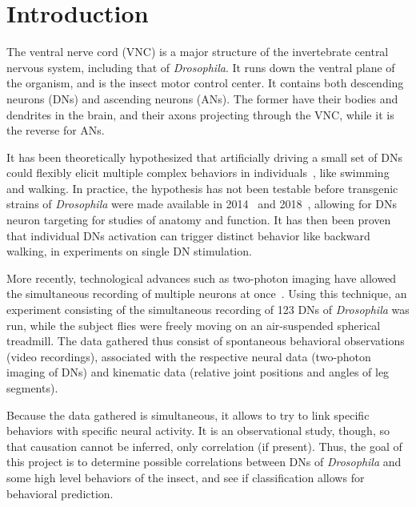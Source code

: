 \section{Introduction}

The ventral nerve cord (VNC) is a major structure of the invertebrate central nervous system, including that of \textit{Drosophila}.
It runs down the ventral plane of the organism, and is the insect motor control center.
It contains both descending neurons (DNs) and ascending neurons (ANs).
The former have their bodies and dendrites in the brain, and their axons projecting through the VNC, while it is the reverse for ANs.

\vspace{\baselineskip}

It has been theoretically hypothesized that artificially driving a small set of DNs could flexibly elicit multiple complex behaviors in individuals~\cite{ijspeert2007}, like swimming and walking.
In practice, the hypothesis has not been testable before transgenic strains of \textit{Drosophila} were made available in 2014~\cite{bidaye2014} and 2018~\cite{namiki2018}, allowing for DNs neuron targeting for studies of anatomy and function.
It has then been proven that individual DNs activation can trigger distinct behavior like backward walking, in experiments on single DN stimulation.

\vspace{\baselineskip}

More recently, technological advances such as two-photon imaging have allowed the simultaneous recording of multiple neurons at once~\cite{chen2018}.
Using this technique, an experiment consisting of the simultaneous recording of 123 DNs of \textit{Drosophila} was run, while the subject flies were freely moving on an air-suspended spherical treadmill.
The data gathered thus consist of spontaneous behavioral observations (video recordings), associated with the respective neural data (two-photon imaging of DNs) and kinematic data (relative joint positions and angles of leg segments).

\vspace{\baselineskip}

Because the data gathered is simultaneous, it allows to try to link specific behaviors with specific neural activity.
It is an observational study, though, so that causation cannot be inferred, only correlation (if present).
Thus, the goal of this project is to determine possible correlations between DNs of \textit{Drosophila} and some high level behaviors of the insect, and see if classification allows for behavioral prediction.

\newpage
